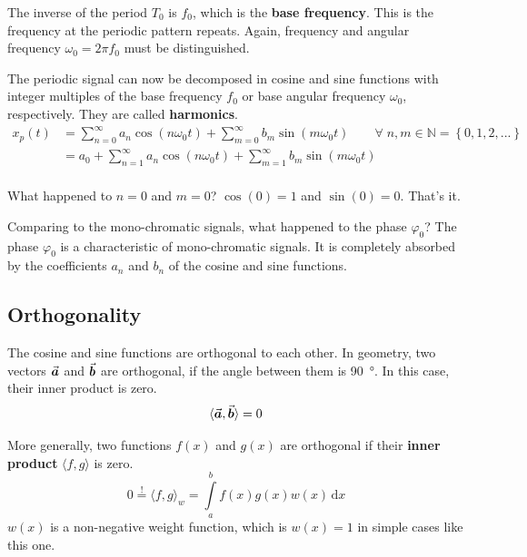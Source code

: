 \begin{refsection}
The inverse of the period $T_0$ is $f_0$, which is the \textbf{base frequency}. This is the frequency at the periodic pattern repeats. Again, frequency and angular frequency $\omega_0 = 2 \pi f_0$ must be distinguished.

The periodic signal can now be decomposed in cosine and sine functions with integer multiples of the base frequency $f_0$ or base angular frequency $\omega_0$, respectively. They are called  \textbf{harmonics}.
\begin{equation}
	\begin{split}
		x_p(t) &= \sum\limits_{n=0}^{\infty} a_n \cos\left(n \omega_0 t\right) + \sum\limits_{m=0}^{\infty} b_m \sin\left(m \omega_0 t\right) \qquad \forall \; n, m \in \mathbb{N} = \left\{0, 1, 2, ...\right\} \\
		 &= a_0 + \sum\limits_{n=1}^{\infty} a_n \cos\left(n \omega_0 t\right) + \sum\limits_{m=1}^{\infty} b_m \sin\left(m \omega_0 t\right) \\
	\end{split}
	\label{eq:ch02:fourier_series}
\end{equation}

What happened to $n = 0$ and $m = 0$? $\cos(0) = 1$ and $\sin(0) = 0$. That's it.

Comparing to the mono-chromatic signals, what happened to the phase $\varphi_0$? The phase $\varphi_0$ is a characteristic of mono-chromatic signals. It is completely absorbed by the coefficients $a_n$ and $b_n$ of the cosine and sine functions.

\subsection{Orthogonality}
The cosine and sine functions are orthogonal to each other. In geometry, two vectors $\vec{\bm{a}}$ and $\vec{\bm{b}}$ are orthogonal, if the angle between them is \SI{90}{\degree}. In this case, their inner product is zero.
\begin{equation}
	\langle \vec{\bm{a}}, \vec{\bm{b}} \rangle = 0
\end{equation}%

More generally, two functions $f(x)$ and $g(x)$ are orthogonal if their  \textbf{inner product} $\langle f, g \rangle$ is zero. 
\begin{equation}
	0 \stackrel{!}{=} \langle f, g \rangle_w = \int\limits_{a}^{b} f(x) g(x) w(x) \, \mathrm{d} x
\end{equation}
$w(x)$ is a non-negative weight function, which is $w(x) = 1$ in simple cases like this one.


\end{refsection}
